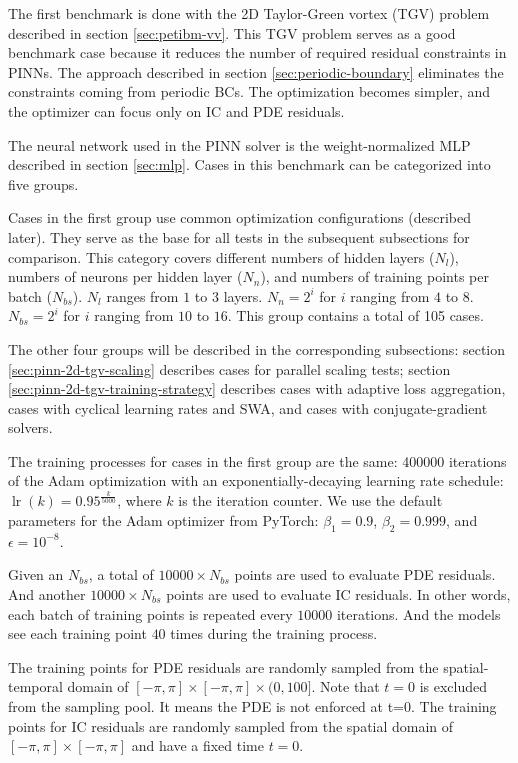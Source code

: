 
The first benchmark is done with the 2D Taylor-Green vortex (TGV) problem described in section \ref{sec:petibm-vv}.
This TGV problem serves as a good benchmark case because it reduces the number of required residual constraints in PINNs.
The approach described in section \ref{sec:periodic-boundary} eliminates the constraints coming from periodic BCs.
The optimization becomes simpler, and the optimizer can focus only on IC and PDE residuals.

The neural network used in the PINN solver is the weight-normalized MLP described in section \ref{sec:mlp}.
Cases in this benchmark can be categorized into five groups.

Cases in the first group use common optimization configurations (described later).
They serve as the base for all tests in the subsequent subsections for comparison.
This category covers different numbers of hidden layers ($N_l$), numbers of neurons per hidden layer ($N_n$), and numbers of training points per batch ($N_{bs}$).
$N_l$ ranges from $1$ to $3$ layers.
$N_n=2^i$ for $i$ ranging from $4$ to $8$.
$N_{bs}=2^i$ for $i$ ranging from $10$ to $16$.
This group contains a total of 105 cases.

The other four groups will be described in the corresponding subsections: section \ref{sec:pinn-2d-tgv-scaling} describes cases for parallel scaling tests; section \ref{sec:pinn-2d-tgv-training-strategy} describes cases with adaptive loss aggregation, cases with cyclical learning rates and SWA, and cases with conjugate-gradient solvers.

The training processes for cases in the first group are the same: \num{400000} iterations of the Adam optimization with an exponentially-decaying learning rate schedule: $\operatorname{lr}(k) = 0.95^\frac{k}{5000}$, where $k$ is the iteration counter.
We use the default parameters for the Adam optimizer from PyTorch: $\beta_1=0.9$, $\beta_2=0.999$, and $\epsilon=10^{-8}$.

Given an $N_{bs}$, a total of $\num{10000} \times N_{bs}$ points are used to evaluate PDE residuals.
And another $\num{10000} \times N_{bs}$ points are used to evaluate IC residuals.
In other words, each batch of training points is repeated every $\num{10000}$ iterations.
And the models see each training point $40$ times during the training process.

The training points for PDE residuals are randomly sampled from the spatial-temporal domain of $[-\pi, \pi]\times[-\pi, \pi]\times(0, 100]$.
Note that $t=0$ is excluded from the sampling pool.
It means the PDE is not enforced at t=0.
The training points for IC residuals are randomly sampled from the spatial domain of $[-\pi, \pi]\times[-\pi, \pi]$ and have a fixed time $t=0$.

